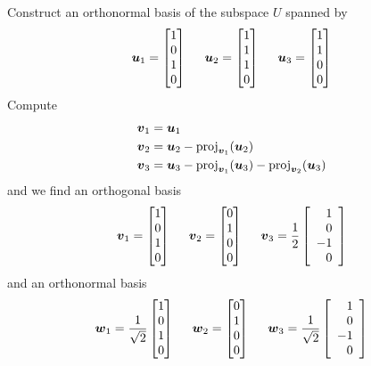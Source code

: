 \begin{example}
Construct an orthonormal basis of the subspace $U$ spanned by
$$
\boldsymbol{u}_1 = \begin{bmatrix} 1 \\ 0 \\ 1 \\ 0 \end{bmatrix}
\hspace{5mm}
\boldsymbol{u}_2 = \begin{bmatrix} 1 \\ 1 \\ 1 \\ 0 \end{bmatrix}
\hspace{5mm}
\boldsymbol{u}_3 = \begin{bmatrix} 1 \\ 1 \\ 0 \\ 0 \end{bmatrix}
$$
Compute
\begin{align*}
\boldsymbol{v}_1 &= \boldsymbol{u}_1 \\
\boldsymbol{v}_2 &= \boldsymbol{u}_2 - \mathrm{proj}_{\boldsymbol{v}_1}(\boldsymbol{u}_2) \\
\boldsymbol{v}_3 &= \boldsymbol{u}_3 - \mathrm{proj}_{\boldsymbol{v}_1}(\boldsymbol{u}_3) - \mathrm{proj}_{\boldsymbol{v}_2}(\boldsymbol{u}_3)
\end{align*}
and we find an orthogonal basis
$$
\boldsymbol{v}_1 = \begin{bmatrix} 1 \\ 0 \\ 1 \\ 0 \end{bmatrix}
\hspace{5mm}
\boldsymbol{v}_2 = \begin{bmatrix} 0 \\ 1 \\ 0 \\ 0 \end{bmatrix}
\hspace{5mm}
\boldsymbol{v}_3 = \frac{1}{2} \left[ \begin{array}{r} 1 \\ 0 \\ -1 \\ 0 \end{array} \right]
$$
and an orthonormal basis
$$
\boldsymbol{w}_1 = \frac{1}{\sqrt{2}} \begin{bmatrix} 1 \\ 0 \\ 1 \\ 0 \end{bmatrix}
\hspace{5mm}
\boldsymbol{w}_2 = \begin{bmatrix} 0 \\ 1 \\ 0 \\ 0 \end{bmatrix}
\hspace{5mm}
\boldsymbol{w}_3 = \frac{1}{\sqrt{2}} \left[ \begin{array}{r} 1 \\ 0 \\ -1 \\ 0 \end{array} \right]
$$
\end{example}

